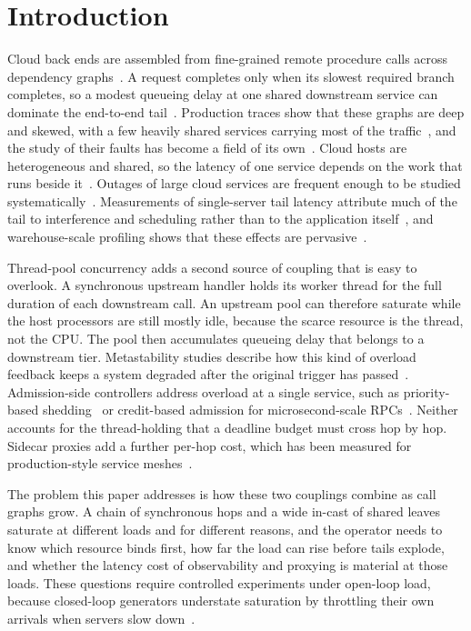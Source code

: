 \section{Introduction}
\label{sec:intro}

Cloud back ends are assembled from fine-grained remote procedure calls across dependency graphs~\cite{dean2013tailatscale,gan2019deathstarbench}. A request completes only when its slowest required branch completes, so a modest queueing delay at one shared downstream service can dominate the end-to-end tail~\cite{dean2013tailatscale}. Production traces show that these graphs are deep and skewed, with a few heavily shared services carrying most of the traffic~\cite{luo2021characterizing}, and the study of their faults has become a field of its own~\cite{zhou2021fault}. Cloud hosts are heterogeneous and shared, so the latency of one service depends on the work that runs beside it~\cite{reiss2012heterogeneity,delimitrou2013paragon}. Outages of large cloud services are frequent enough to be studied systematically~\cite{gunawi2016cloud}. Measurements of single-server tail latency attribute much of the tail to interference and scheduling rather than to the application itself~\cite{li2014tales,fried2020caladan}, and warehouse-scale profiling shows that these effects are pervasive~\cite{kanev2015profiling}.

Thread-pool concurrency adds a second source of coupling that is easy to overlook. A synchronous upstream handler holds its worker thread for the full duration of each downstream call. An upstream pool can therefore saturate while the host processors are still mostly idle, because the scarce resource is the thread, not the CPU. The pool then accumulates queueing delay that belongs to a downstream tier. Metastability studies describe how this kind of overload feedback keeps a system degraded after the original trigger has passed~\cite{bronson2021metastable,huang2022metastable}. Admission-side controllers address overload at a single service, such as priority-based shedding~\cite{zhou2018dagor} or credit-based admission for microsecond-scale RPCs~\cite{cho2020breakwater}. Neither accounts for the thread-holding that a deadline budget must cross hop by hop. Sidecar proxies add a further per-hop cost, which has been measured for production-style service meshes~\cite{zhu2023sidecar}.

The problem this paper addresses is how these two couplings combine as call graphs grow. A chain of synchronous hops and a wide in-cast of shared leaves saturate at different loads and for different reasons, and the operator needs to know which resource binds first, how far the load can rise before tails explode, and whether the latency cost of observability and proxying is material at those loads. These questions require controlled experiments under open-loop load, because closed-loop generators understate saturation by throttling their own arrivals when servers slow down~\cite{schroeder2006open}.


